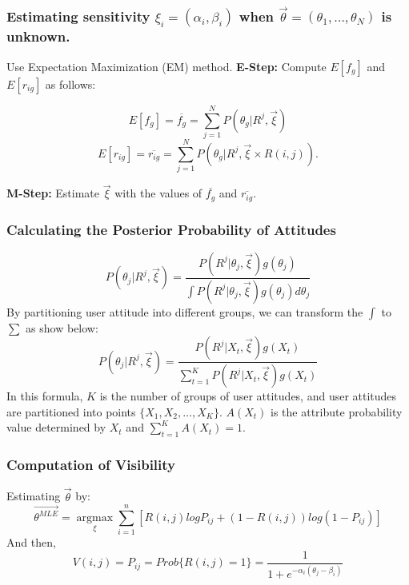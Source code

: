\documentclass{beamer}
\begin{document}
\begin{frame}
  \frametitle{\small{Estimating sensitivity $\xi_i=(\alpha_i,\beta_i)$ when
      $\overrightarrow{\theta}=(\theta_1,\dots,\theta_N)$ is unknown.}}
  \begin{block}
      {Use Expectation Maximization (EM) method.}
      \textbf{E-Step:} Compute $E[f_g]$ and $E[r_{ig}]$ as follows:

      \[E[f_g]=\overline{f_g}=\sum_{j=1}^NP(\theta_g|R^j,\overrightarrow{\xi})\] 
      \[E[r_{ig}]=\overline{r_{ig}}=\sum_{j=1}^NP(\theta_g|R^j,\overrightarrow{\xi}\times R(i,j)).\]

      \textbf{M-Step:} Estimate $\overrightarrow{\xi}$ with the values
      of $\overline{f_g}$ and $\overline{r_{ig}}$.
  \end{block}
\end{frame}

\begin{frame}
  \frametitle{Calculating the Posterior Probability of Attitudes}
  \[P(\theta_j|R^j,\overrightarrow{\xi})=\frac{P(R^j|\theta_j,\overrightarrow{\xi})g(\theta_j)}
  {\int{P(R^j|\theta_j,\overrightarrow{\xi})g(\theta_j)d\theta_j}}\]
  By partitioning user attitude into different groups, we can transform the $\int$
  to $\sum$ as show below: 
  \[P(\theta_j|R^j,\overrightarrow{\xi})=\frac{P(R^j|X_t,\overrightarrow{\xi})g(X_t)}
  {\sum_{t=1}^K{P(R^j|X_t,\overrightarrow{\xi})g(X_t)}}\]
  In this formula, $K$ is the number of groups of user attitudes, and user
  attitudes are partitioned into points $\{X_1,X_2,\ldots,X_K\}$. $A(X_t)$ is
  the attribute probability value determined by $X_t$ and $\sum_{t=1}^KA(X_t)=1$.
\end{frame}

% 
\begin{frame}
  \frametitle{Computation of Visibility}
  Estimating $\overrightarrow{\theta}$ by:
  \[\overrightarrow{\theta^{MLE}}=\underset{\xi}{\operatorname{\arg\max}}
  {\sum_{i=1}^n[R(i,j)logP_{ij}+(1-R(i,j))log(1-P_{ij})]}\]
  And then, 
  \[V(i,j)=P_{ij}=Prob\{R(i,j)=1\}=\frac{1}{1+e^{-\alpha_i(\theta_j-\beta_i)}}\]
\end{frame}

\end{document}
